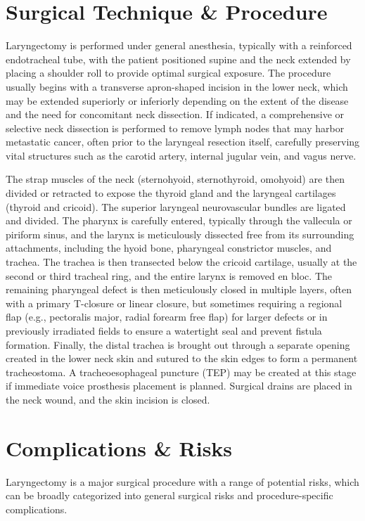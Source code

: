 \section*{Surgical Technique \& Procedure}
Laryngectomy is performed under general anesthesia, typically with a reinforced endotracheal tube, with the patient positioned supine and the neck extended by placing a shoulder roll to provide optimal surgical exposure. The procedure usually begins with a transverse apron-shaped incision in the lower neck, which may be extended superiorly or inferiorly depending on the extent of the disease and the need for concomitant neck dissection. If indicated, a comprehensive or selective neck dissection is performed to remove lymph nodes that may harbor metastatic cancer, often prior to the laryngeal resection itself, carefully preserving vital structures such as the carotid artery, internal jugular vein, and vagus nerve.

The strap muscles of the neck (sternohyoid, sternothyroid, omohyoid) are then divided or retracted to expose the thyroid gland and the laryngeal cartilages (thyroid and cricoid). The superior laryngeal neurovascular bundles are ligated and divided. The pharynx is carefully entered, typically through the vallecula or piriform sinus, and the larynx is meticulously dissected free from its surrounding attachments, including the hyoid bone, pharyngeal constrictor muscles, and trachea. The trachea is then transected below the cricoid cartilage, usually at the second or third tracheal ring, and the entire larynx is removed en bloc. The remaining pharyngeal defect is then meticulously closed in multiple layers, often with a primary T-closure or linear closure, but sometimes requiring a regional flap (e.g., pectoralis major, radial forearm free flap) for larger defects or in previously irradiated fields to ensure a watertight seal and prevent fistula formation. Finally, the distal trachea is brought out through a separate opening created in the lower neck skin and sutured to the skin edges to form a permanent tracheostoma. A tracheoesophageal puncture (TEP) may be created at this stage if immediate voice prosthesis placement is planned. Surgical drains are placed in the neck wound, and the skin incision is closed.

\section*{Complications \& Risks}
Laryngectomy is a major surgical procedure with a range of potential risks, which can be broadly categorized into general surgical risks and procedure-specific complications.


